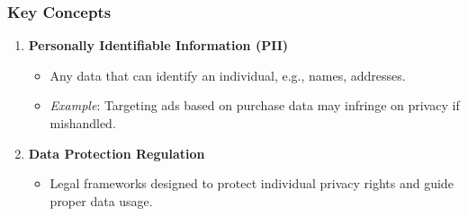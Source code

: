 \documentclass[aspectratio=169]{beamer}
\begin{document}
\begin{frame}[fragile]
    \frametitle{Key Concepts}
    \begin{enumerate}
        \item \textbf{Personally Identifiable Information (PII)} 
        \begin{itemize}
            \item Any data that can identify an individual, e.g., names, addresses.
            \item \textit{Example}: Targeting ads based on purchase data may infringe on privacy if mishandled.
        \end{itemize}
        
        \item \textbf{Data Protection Regulation}
        \begin{itemize}
            \item Legal frameworks designed to protect individual privacy rights and guide proper data usage.
        \end{itemize}
    \end{enumerate}
\end{frame}
\end{document}
